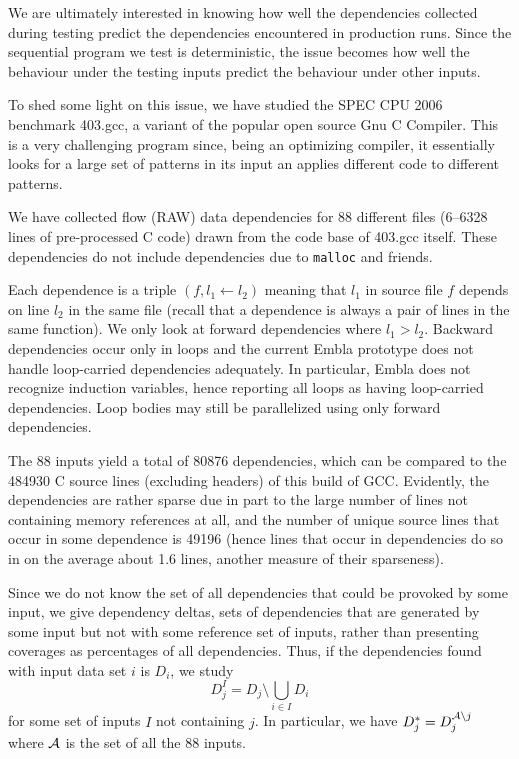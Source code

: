 \documentclass[times, 10pt,twocolumn]{article}
\begin{document}
We are ultimately interested in knowing how well the dependencies
collected during testing predict the dependencies encountered in
production runs.  Since the sequential program we test is
deterministic, the issue becomes how well the behaviour under the
testing inputs predict the behaviour under other inputs.

To shed some light on this issue, we have studied the SPEC CPU 2006
benchmark 403.gcc, a variant of the popular open source Gnu C
Compiler. This is a very challenging program since, being an
optimizing compiler, it essentially looks for a large set of patterns
in its input an applies different code to different patterns.

We have collected flow (RAW) data dependencies for 88 different files
(6--6328 lines of pre-processed C code) drawn from the code base of
403.gcc itself. These dependencies do not include dependencies due to
{\tt malloc} and friends.

Each dependence is a triple $({ f}, { l}_1 \leftarrow { l}_2)$
meaning that $ l_1$ in source file $ f$ depends on line
$ l_2$ in the same file (recall that a dependence is always a
pair of lines in the same function). We only look at forward dependencies where 
$l_1>l_2$. Backward dependencies occur only in loops and the current
Embla prototype does not handle loop-carried dependencies adequately.
In particular, Embla does not recognize induction variables, hence
reporting all loops as having loop-carried dependencies. Loop bodies 
may still be parallelized using only forward dependencies.

The 88 inputs yield a total of 80876 dependencies, which
can be compared to the 484930 C source lines (excluding headers) of
this build of GCC. Evidently, the dependencies are rather sparse due
in part to the large number of lines not containing memory references at all,
and the number of unique source lines that occur in some dependence is
49196 (hence lines that occur in dependencies do so in on the average
about 1.6 lines, another measure of their sparseness).

Since we do not know the set of all dependencies that could be
provoked by some input, we give dependency deltas, sets of
dependencies that are generated by some input but not with some
reference set of inputs, rather than presenting coverages as
percentages of all dependencies. Thus, if the dependencies found with input data set $i$ is
$D_i$, we study \[D_j^I = D_j \setminus \bigcup_{i \in I} D_i\] for
some set of inputs $I$ not containing $j$. In particular, we have
$D_j^\ast = D_j^{{\cal A} \setminus j}$ where $\cal A$ is the set of
all the 88 inputs.
\end{document}
